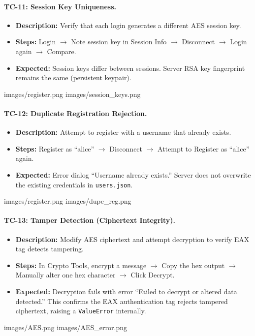 \documentclass[12pt,a4paper]{article}
\begin{document}
\paragraph{TC-11: Session Key Uniqueness.}
\begin{itemize}
    \item \textbf{Description:} Verify that each login generates a different AES session key.
    \item \textbf{Steps:} Login $\to$ Note session key in Session Info $\to$ Disconnect $\to$ Login again $\to$ Compare.
    \item \textbf{Expected:} Session keys differ between sessions. Server RSA key fingerprint remains the same (persistent keypair).
\end{itemize}
    {images/register.png}%
    {images/session_keys.png}%

\paragraph{TC-12: Duplicate Registration Rejection.}
\begin{itemize}
    \item \textbf{Description:} Attempt to register with a username that already exists.
    \item \textbf{Steps:} Register as ``alice'' $\to$ Disconnect $\to$ Attempt to Register as ``alice'' again.
    \item \textbf{Expected:} Error dialog ``Username already exists.'' Server does not overwrite the existing credentials in \texttt{users.json}.
\end{itemize}
    {images/register.png}%
    {images/dupe_reg.png}%

\paragraph{TC-13: Tamper Detection (Ciphertext Integrity).}
\begin{itemize}
    \item \textbf{Description:} Modify AES ciphertext and attempt decryption to verify EAX tag detects tampering.
    \item \textbf{Steps:} In Crypto Tools, encrypt a message $\to$ Copy the hex output $\to$ Manually alter one hex character $\to$ Click Decrypt.
    \item \textbf{Expected:} Decryption fails with error ``Failed to decrypt or altered data detected.'' This confirms the EAX authentication tag rejects tampered ciphertext, raising a \texttt{ValueError} internally.
\end{itemize}
    {images/AES.png}%
    {images/AES_error.png}%
\end{document}

